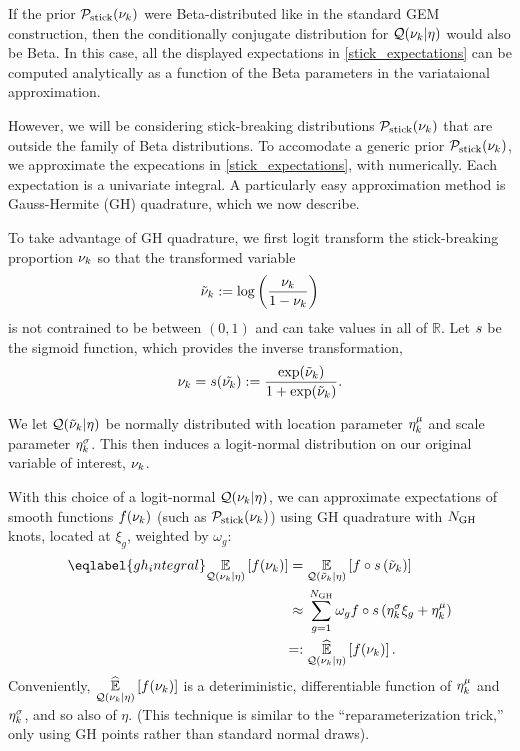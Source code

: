 If the prior $\mathcal{P}_{\mathrm{stick}}(\nu_{k})$ were Beta-distributed like in the standard GEM construction,
then the conditionally conjugate distribution for $\mathcal{Q}(\nu_{k} \vert \eta)$ would also be Beta.
In this case, all the displayed expectations in \eqref{stick_expectations}
can be computed analytically as a function of
the Beta parameters in the variataional approximation.

However, we will be considering stick-breaking distributions $\mathcal{P}_{\mathrm{stick}}(\nu_{k})$ that
are outside the family of Beta distributions.
To accomodate a generic prior $\mathcal{P}_{\mathrm{stick}}(\nu_{k})$,
we approximate the expecations in \eqref{stick_expectations},
with numerically.
Each expectation is a univariate integral.
A particularly easy approximation method is
Gauss-Hermite (GH) quadrature, which we now describe.

To take advantage of GH quadrature, we first logit transform the stick-breaking
proportion $\nu_{k}$ so that the transformed variable
\begin{align*}
  \tilde{\nu}_{k} := \log\left(\frac{\nu_{k}}{1 - \nu_{k}}\right)
\end{align*}
is not contrained to be between $(0, 1)$ and can take values in all of $\mathbb{R}$.
Let $s$ be the sigmoid function,
which provides the inverse transformation,
\begin{align*}
  \nu_{k} = s(\tilde{\nu_{k}}) := \frac{\exp(\tilde{\nu}_k)}{1 + \exp(\tilde{\nu}_k)}.
\end{align*}

We let $\mathcal{Q}(\tilde{\nu}_k \vert \eta)$ be normally distributed with
location parameter $\eta^{\mu}_k$ and scale parameter $\eta^{\sigma}_k$.
This then induces a logit-normal
distribution on our original variable of interest, $\nu_{k}$.

With this choice of a logit-normal $\mathcal{Q}(\nu_{k} \vert \eta)$,
we can approximate expectations of smooth functions
$f(\nu_{k})$ (such as $\mathcal{P}_{\mathrm{stick}}(\nu_{k})$) using GH quadrature with $N_{\mathrm{GH}}$ knots,
located at $\xi_g$, weighted by $\omega_g$:
%
\begin{align}\eqlabel{gh_integral}
%
\expect{\q(\nuk \vert \eta)}{f(\nuk)} ={}&
\expect{\q(\lnu_\k \vert \eta)}
       {f\circ \s\left(\lnu_\k\right)}
\nonumber\\\approx{}&
    \sum_{g=1}^{\ngh} \omega_g f\circ \s \left(\lnusd_\k \xi_{g} + \lnumean_\k\right)
 \nonumber\\=:{}&
\expecthat{\q(\nuk \vert \eta)}{f(\nuk)}.
%
\end{align}
%
Conveniently, $\underset{\mathcal{Q}(\nu_{k} \vert \eta)}{\widehat{\mathbb{E}}}\left[f(\nu_{k})\right]$ is a deteriministic, differentiable
function of $\eta^{\mu}_k$ and $\eta^{\sigma}_k$, and so also of $\eta$.  (This
technique is similar to the ``reparameterization trick,'' only using
GH points rather than standard normal draws).

